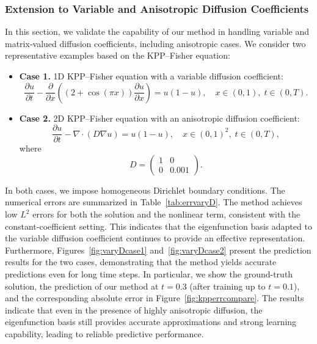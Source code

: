 \documentclass[preprint,12pt]{elsarticle}
\theoremstyle{plain}
\numberwithin{figure}{section}
\numberwithin{table}{section}
\newcommand{\jdall}[1]{{\color{black}#1}}
\begin{document}
\jdall{
\subsubsection{Extension to Variable and Anisotropic Diffusion Coefficients}  

In this section, we validate the capability of our method in handling variable and matrix-valued diffusion coefficients, including anisotropic cases. We consider two representative examples based on the KPP–Fisher equation:  

\begin{itemize}
    \item \textbf{Case 1.} 1D KPP–Fisher equation with a variable diffusion coefficient:  
    \begin{equation}
        \frac{\partial u}{\partial t} - \frac{\partial}{\partial x}\!\left((2+\cos(\pi x))\frac{\partial u}{\partial x}\right) = u(1-u), 
        \quad x \in (0,1), \; t \in (0,T).
    \end{equation}

    \item \textbf{Case 2.} 2D KPP–Fisher equation with an anisotropic diffusion coefficient:  
    \begin{equation}
        \frac{\partial u}{\partial t} - \nabla \cdot (D \nabla u) = u(1-u), 
        \quad x \in (0,1)^2, \; t \in (0,T),
    \end{equation}
    where 
    \begin{equation}
        D = 
        \begin{pmatrix}
            1 & 0 \\
            0 & 0.001
        \end{pmatrix}.
    \end{equation}
\end{itemize}

In both cases, we impose homogeneous Dirichlet boundary conditions. The numerical errors are summarized in Table~\ref{tab:errvaryD}. The method achieves low $L^2$ errors for both the solution and the nonlinear term, consistent with the constant-coefficient setting. This indicates that the eigenfunction basis adapted to the variable diffusion coefficient continues to provide an effective representation. Furthermore, Figures~\ref{fig:varyDcase1} and~\ref{fig:varyDcase2} present the prediction results for the two cases, demonstrating that the method yields accurate predictions even for long time steps. In particular, we show the ground-truth solution, the prediction of our method at $t=0.3$ (after training up to $t=0.1$), and the corresponding absolute error in Figure~\ref{fig:kpperrcompare}. The results indicate that even in the presence of highly anisotropic diffusion, the eigenfunction basis still provides accurate approximations and strong learning capability, leading to reliable predictive performance.  

}
\end{document}

